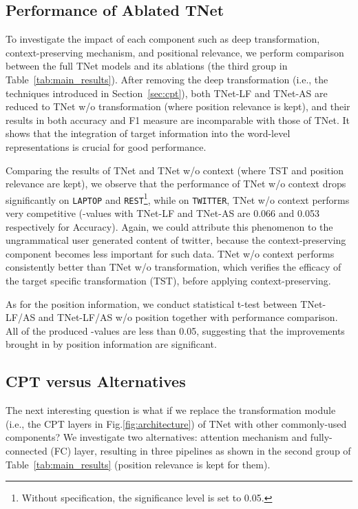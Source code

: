 \documentclass[11pt,a4paper]{article}
\begin{document}
\subsection{Performance of Ablated TNet}



To investigate the impact of each component such as deep transformation, context-preserving mechanism, and positional relevance, we perform comparison between the full TNet models and its ablations (the third group in Table~\ref{tab:main_results}). After removing the deep transformation (i.e., the techniques introduced in Section~\ref{sec:cpt}), both TNet-LF and TNet-AS are reduced to TNet w/o transformation (where position relevance is kept), and their results in both accuracy and F1 measure are incomparable with those of TNet. It shows that the integration of target information into the word-level representations is crucial for good performance. 

Comparing the results of TNet and TNet w/o context (where TST and position relevance are kept), we observe that the performance of TNet w/o context drops significantly on \texttt{LAPTOP} and \texttt{REST}\footnote{Without specification, the significance level is set to 0.05.}, while on \texttt{TWITTER}, TNet w/o context performs very competitive (-values with TNet-LF and TNet-AS are 0.066 and 0.053 respectively for Accuracy). Again, we could attribute this phenomenon to the ungrammatical user generated content of twitter, because the context-preserving component becomes less important for such data. TNet w/o context performs consistently better than TNet w/o transformation, which verifies the efficacy of the target specific transformation (TST), before applying context-preserving. 

As for the position information, we conduct statistical t-test between TNet-LF/AS and TNet-LF/AS w/o position together with performance comparison. All of the produced -values are less than 0.05, suggesting that the improvements brought in by position information are significant. 






\subsection{CPT versus Alternatives}
The next interesting question is what if we replace the transformation module (i.e., the CPT layers in Fig.\ref{fig:architecture}) of TNet with other commonly-used components? We investigate two alternatives: attention mechanism and fully-connected (FC) layer, resulting in three pipelines as shown in the second group of Table~\ref{tab:main_results} (position relevance is kept for them).
\end{document}
